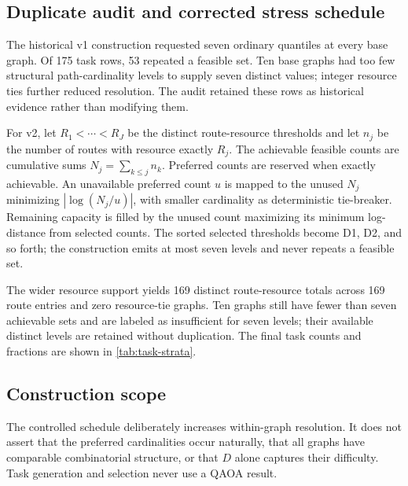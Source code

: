 \subsection{Duplicate audit and corrected stress schedule}

The historical v1 construction requested seven ordinary quantiles at every
base graph. Of 175 task rows, 53 repeated a feasible set. Ten base graphs had
too few structural path-cardinality levels to supply seven distinct values;
integer resource ties further reduced resolution. The audit retained these
rows as historical evidence rather than modifying them.

For v2, let $R_1<\cdots<R_J$ be the distinct route-resource thresholds and
let $n_j$ be the number of routes with resource exactly $R_j$. The achievable
feasible counts are cumulative sums $N_j=\sum_{k\leq j}n_k$. Preferred counts
are reserved when exactly achievable. An unavailable preferred count $u$ is
mapped to the unused $N_j$ minimizing $|\log(N_j/u)|$, with smaller cardinality
as deterministic tie-breaker. Remaining capacity is filled by the unused
count maximizing its minimum log-distance from selected counts. The sorted
selected thresholds become D1, D2, and so forth; the construction emits at
most seven levels and never repeats a feasible set.

The wider resource support yields 169 distinct route-resource totals across
169 route entries and zero resource-tie graphs. Ten graphs still have fewer
than seven achievable sets and are labeled as insufficient for seven levels;
their available distinct levels are retained without duplication. The final
task counts and fractions are shown in \cref{tab:task-strata}.



\subsection{Construction scope}

The controlled schedule deliberately increases within-graph resolution. It
does not assert that the preferred cardinalities occur naturally, that all
graphs have comparable combinatorial structure, or that $D$ alone captures
their difficulty. Task generation and selection never use a QAOA result.

